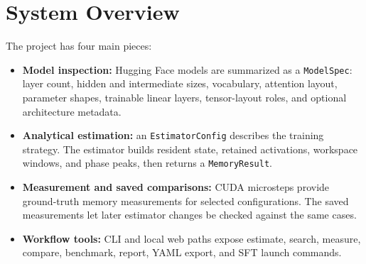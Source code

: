 \section{System Overview}
The project has four main pieces:
\begin{itemize}[leftmargin=1.4em]
\item \textbf{Model inspection:} Hugging Face models are summarized as a
\texttt{ModelSpec}: layer count, hidden and intermediate sizes, vocabulary,
attention layout, parameter shapes, trainable linear layers, tensor-layout
roles, and optional architecture metadata.
\item \textbf{Analytical estimation:} an \texttt{EstimatorConfig} describes the
training strategy. The estimator builds resident state, retained activations,
workspace windows, and phase peaks, then returns a \texttt{MemoryResult}.
\item \textbf{Measurement and saved comparisons:} CUDA microsteps provide
ground-truth memory measurements for selected configurations. The saved
measurements let later estimator changes be checked against the same cases.
\item \textbf{Workflow tools:} CLI and local web paths expose estimate, search,
measure, compare, benchmark, report, YAML export, and SFT launch commands.
\end{itemize}
